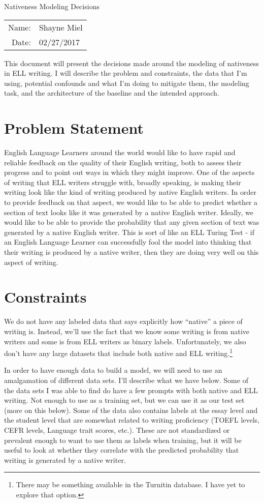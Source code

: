 \documentclass[12pt]{article}
\begin{document}
\begin{center}
{\Large Nativeness Modeling Decisions}

\begin{tabular}{rl}
Name: & Shayne Miel \\
Date: & 02/27/2017
\end{tabular}
\end{center}

This document will present the decisions made around the modeling of nativeness
in ELL writing. I will describe the problem and constraints, the data that I'm
using, potential confounds and what I'm doing to mitigate them, the modeling task,
and the architecture of the baseline and the intended approach.

\section*{Problem Statement}
English Language Learners around the world would like to have rapid and reliable
feedback on the quality of their English writing, both to assess their progress
and to point out ways in which they might improve. One of the aspects of writing
that ELL writers struggle with, broadly speaking, is making their writing look
like the kind of writing produced by native English writers. In order to provide
feedback on that aspect, we would like to be able to predict whether a section
of text looks like it was generated by a native English writer. Ideally, we would
like to be able to provide the probability that any given section of text was
generated by a native English writer. This is sort of like an ELL Turing Test -
if an English Language Learner can successfully fool the model into thinking
that their writing is produced by a native writer, then they are doing very well
on this aspect of writing.

\section*{Constraints}
We do not have any labeled data that says explicitly how ``native'' a piece of
writing is. Instead, we'll use the fact that we know some writing is from native
writers and some is from ELL writers as binary labels. Unfortunately, we also
don't have any large datasets that include both native and ELL writing.\footnote{
There may be something available in the Turnitin database. I have yet to explore
that option.}

In order to have enough data to build a model, we will need to use an amalgamation
of different data sets. I'll describe what we have below. Some of the data sets
I was able to find do have a few prompts with both native and ELL writing. Not enough
to use as a training set, but we can use it as our test set (more on this below).
Some of the data also contains labels at the essay level and the student level
that are somewhat related to writing proficiency (TOEFL levels, CEFR levels, Language
trait scores, etc.). These are not standardized or prevalent enough to want to
use them as labels when training, but it will be useful to look at whether they
correlate with the predicted probability that writing is generated by a native writer.
\end{document}
